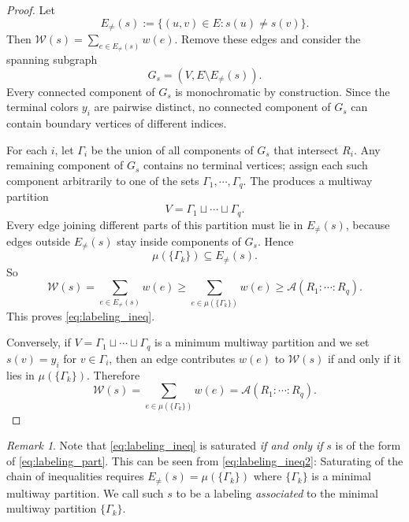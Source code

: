 \documentclass[11pt,oneside,letterpaper]{article}
\numberwithin{equation}{section}
\theoremstyle{definition}
\theoremstyle{remark}
\newtheorem{remark}[theorem]{Remark}
\begin{document}
\begin{proof}
  Let
  \begin{equation}
    E_{\ne} (s) := \{(u,v)\in E: s(u)\ne s(v)\}.
  \end{equation}
  Then $\mathcal{W}(s) = \sum_{e\in E_{\ne}(s)}w(e)$. Remove these edges and consider the spanning subgraph
  \begin{equation}
    G_s = (V,E\setminus E_{\ne}(s)).
  \end{equation}
  Every connected component of $G_s$ is monochromatic by construction. Since the terminal colors $y_i$ are pairwise distinct, no connected component of $G_s$ can contain boundary vertices of different indices.

  For each $i$, let $\Gamma_i$ be the union of all components of $G_s$ that intersect $R_i$. Any remaining component of $G_s$ contains no terminal vertices; assign each such component arbitrarily to one of the sets $\Gamma_1,\cdots,\Gamma_q$. The produces a multiway partition
  \begin{equation}
    V= \Gamma_1 \sqcup\cdots\sqcup \Gamma_q.
  \end{equation}
  Every edge joining different parts of this partition must lie in $E_{\ne}(s)$, because edges outside $E_{\ne}(s)$ stay inside components of $G_s$. Hence
  \begin{equation}
    \mu(\{\Gamma_k\}) \subseteq E_{\ne} (s).
  \end{equation}
  So
  \begin{equation}
    \label{eq:labeling_ineq2}
    \mathcal{W}(s) = \sum_{e\in E_{\ne}(s)} w(e) \ge \sum_{e\in \mu(\{\Gamma_k\})} w(e) \ge \mathcal{A}(R_1:\cdots :R_q).
  \end{equation}
  This proves \eqref{eq:labeling_ineq}.

  Conversely, if $V=\Gamma_1\sqcup\cdots\sqcup \Gamma_q$ is a minimum multiway partition and we set $s(v)=y_i$ for $v\in \Gamma_i$, then an edge contributes $w(e)$ to $\mathcal{W}(s)$ if and only if it lies in $\mu(\{\Gamma_k\})$. Therefore
  \begin{equation}
    \mathcal{W}(s) = \sum_{e\in \mu(\{\Gamma_k\})} w(e) = \mathcal{A}(R_1:\cdots :R_q).
  \end{equation}
\end{proof}

\begin{remark}
  \label{rem:labeling}
  Note that \eqref{eq:labeling_ineq} is saturated \emph{if and only if} $s$ is of the form of \eqref{eq:labeling_part}. This can be seen from \eqref{eq:labeling_ineq2}: Saturating of the chain of inequalities requires $E_{\ne}(s)=\mu(\{\Gamma_k\})$ where $\{\Gamma_k\}$ is a minimal multiway partition. We call such $s$ to be a labeling \emph{associated} to the minimal multiway partition $\{\Gamma_k\}$.
\end{remark}
\end{document}
